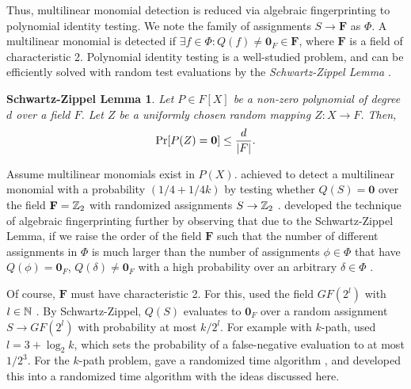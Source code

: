 Thus, multilinear monomial detection is reduced via algebraic fingerprinting 
to polynomial identity testing. 
We note the family of assignments $S \to \mathbf{F}$ as $\Phi$. 
A multilinear monomial is detected if 
$\exists f \in \Phi \colon Q(f) \neq \mathbf{0}_F \in \mathbf{F}$, 
where $\mathbf{F}$ is a field of characteristic 2. 
Polynomial identity testing is a well-studied problem, and can be efficiently 
solved with random test evaluations by the \emph{Schwartz-Zippel Lemma} \cite{Saxena09}.

\newtheorem*{lemmaSZ}{Schwartz-Zippel Lemma}
\begin{lemmaSZ}
  Let $P \in F[X]$ be a non-zero polynomial of degree $d$ over a field $F$. 
  Let $Z$ be a uniformly chosen random mapping $Z \colon X \to F$. Then, 
  \[
    \Pr[P(Z) = \mathbf{0}] \leq \frac{d}{{\left\vert F\right\vert}}.  
  \]
\end{lemmaSZ}

Assume multilinear monomials exist in $P(X)$. 
\citeauthor{Koutis08} achieved to detect a multilinear monomial 
with a probability $(1/4 + 1/{4k})$ by testing whether 
$Q(S) = \mathbf{0}$ over the field $\mathbf{F} = \mathbb Z_2$  
with randomized assignments $S \to \mathbb Z_2$ \cite{Koutis08}. 
\citeauthor{Williams09} developed the technique of algebraic fingerprinting 
further by observing that due to the Schwartz-Zippel Lemma, %
if we raise the order of the field $\mathbf{F}$ 
such that the number of different assignments in $\Phi$ is much larger than 
the number of assignments $\phi \in \Phi$ that have $Q(\phi) = \mathbf{0}_F$, 
$Q(\delta) \neq \mathbf{0}_F$ with a high probability over an arbitrary $\delta \in \Phi$ 
\cite{Williams09}. 

Of course, $\mathbf{F}$ must have characteristic 2. For this, \citeauthor{Williams09} 
used the field $GF(2^{l})$ with $l \in \mathbb N$ \cite{Williams09}. By Schwartz-Zippel, $Q(S)$ 
evaluates to $\mathbf{0}_F$ over a random assignment $S \to GF(2^{l})$ with probability 
at most $k/{2^l}$. For example with $k$-path, 
\citeauthor{Williams09} used $l = 3 + \log_2k$, 
which sets the probability of a false-negative evaluation 
to at most $1/2^3$. 
For the $k$-path problem, \citeauthor{Koutis08} 
gave a randomized  time algorithm \cite{Koutis08}, 
and \citeauthor{Williams09} developed this into a randomized  
time algorithm \cite{Williams09} with the ideas discussed here.

